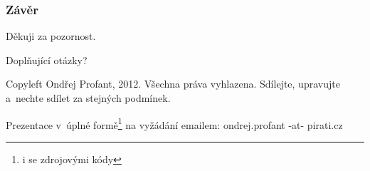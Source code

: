 \documentclass[xetex]{beamer}
\begin{document}
\begin{frame}
  \frametitle{Závěr}
	Děkuji za pozornost.

	\bigskip
	
	Doplňující otázky?

\bigskip

\bigskip

\scriptsize
Copyleft Ondřej Profant, 2012. Všechna práva vyhlazena. Sdílejte, upravujte a~nechte sdílet za stejných podmínek. 

Prezentace v~úplné formě\footnote{i se zdrojovými kódy} na vyžádání emailem: ondrej.profant -at- pirati.cz 
\end{frame}
\end{document}
